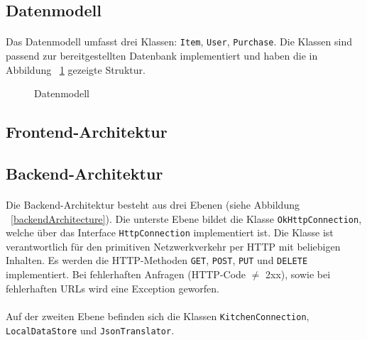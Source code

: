 \documentclass{scrartcl}
\begin{document}
		\subsection{Datenmodell} \label{architecture.datamodel}
			\paragraph*{}
			Das Datenmodell umfasst drei Klassen: \texttt{Item}, \texttt{User}, \texttt{Purchase}. Die Klassen sind passend zur bereitgestellten Datenbank implementiert und haben die in Abbildung ~\ref{datamodel} gezeigte Struktur.
		
		\begin{figure}[!h]
			\label{datamodel}
			\caption{Datenmodell}
		\end{figure}
		
		
		\subsection{Frontend-Architektur} \label{architecture.frontend}
		
		\subsection{Backend-Architektur} \label{architecture.backend}
			\paragraph*{}
			Die Backend-Architektur besteht aus drei Ebenen (siehe Abbildung ~\ref{backendArchitecture}). Die unterste Ebene bildet die Klasse \texttt{OkHttpConnection}, welche über das Interface \texttt{HttpConnection} implementiert ist. Die Klasse ist verantwortlich für den primitiven Netzwerkverkehr per HTTP mit beliebigen Inhalten. Es werden die HTTP-Methoden \texttt{GET}, \texttt{POST}, \texttt{PUT} und \texttt{DELETE} implementiert. Bei fehlerhaften Anfragen (HTTP-Code $\neq$ 2xx), sowie bei fehlerhaften URLs wird eine Exception geworfen.
			
			\paragraph*{}
			Auf der zweiten Ebene befinden sich die Klassen \texttt{KitchenConnection}, \texttt{LocalDataStore} und \texttt{JsonTranslator}.
			
\end{document}

